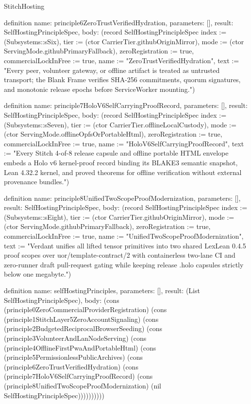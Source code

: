 \begin{lexlean}{StitchHosting}
\begin{semanticmodule}
definition{
  name: principle6ZeroTrustVerifiedHydration,
  parameters: [],
  result: SelfHostingPrincipleSpec,
  body: (record SelfHostingPrincipleSpec {index := (Subsystems::sSix), tier := (ctor CarrierTier.githubOriginMirror), mode := (ctor ServingMode.githubPrimaryFallback), zeroRegistration := true, commercialLockInFree := true, name := "ZeroTrustVerifiedHydration", text := "Every peer, volunteer gateway, or offline artifact is treated as untrusted transport; the Blank Frame verifies SHA-256 commitments, quorum signatures, and monotonic release epochs before ServiceWorker mounting."})
}

definition{
  name: principle7HoloV6SelfCarryingProofRecord,
  parameters: [],
  result: SelfHostingPrincipleSpec,
  body: (record SelfHostingPrincipleSpec {index := (Subsystems::sSeven), tier := (ctor CarrierTier.offlineLocalCustody), mode := (ctor ServingMode.offlineOpfsOrPortableHtml), zeroRegistration := true, commercialLockInFree := true, name := "HoloV6SelfCarryingProofRecord", text := "Every Stitch 4-of-8 release capsule and offline portable HTML envelope embeds a Holo v6 kernel-proof record binding its BLAKE3 semantic snapshot, Lean 4.32.2 kernel, and proved theorems for offline verification without external provenance bundles."})
}

definition{
  name: principle8UnifiedTwoScopeProofModernization,
  parameters: [],
  result: SelfHostingPrincipleSpec,
  body: (record SelfHostingPrincipleSpec {index := (Subsystems::sEight), tier := (ctor CarrierTier.githubOriginMirror), mode := (ctor ServingMode.githubPrimaryFallback), zeroRegistration := true, commercialLockInFree := true, name := "UnifiedTwoScopeProofModernization", text := "Verdant unifies all lifted tensor primitives into two shared LexLean 0.4.5 proof scopes over uor/template-contract/2 with containerless two-lane CI and zero-runner draft pull-request gating while keeping release .holo capsules strictly below one megabyte."})
}

definition{
  name: selfHostingPrinciples,
  parameters: [],
  result: (List SelfHostingPrincipleSpec),
  body: (cons (principle0ZeroCommercialProviderRegistration) (cons (principle1StitchLayer5ZeroAccountSignaling) (cons (principle2BudgetedReciprocalBrowserSeeding) (cons (principle3VolunteerAndLanNodeServing) (cons (principle4OfflineFirstPwaAndPortableHtml) (cons (principle5PermissionlessPublicArchives) (cons (principle6ZeroTrustVerifiedHydration) (cons (principle7HoloV6SelfCarryingProofRecord) (cons (principle8UnifiedTwoScopeProofModernization) (nil SelfHostingPrincipleSpec))))))))))
}


\end{semanticmodule}
\end{lexlean}
